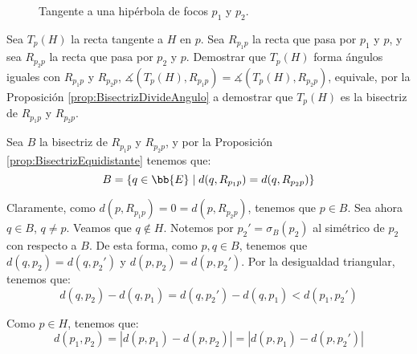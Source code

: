 \begin{ejercicio}
\begin{enumerate}
\begin{figure}[H]
        \caption{Tangente a una hipérbola de focos $p_1$ y $p_2$.}  
        \label{fig:ej5.3.7.TangenteHip}
    \end{figure}
    Sea $T_p(H)$ la recta tangente a $H$ en $p$. Sea $R_{p_1p}$ la recta que pasa por $p_1$ y $p$,
    y sea $R_{p_2p}$ la recta que pasa por $p_2$ y $p$. Demostrar que $T_p(H)$ forma ángulos iguales con $R_{p_1p}$ y $R_{p_2p}$,     
    $\measuredangle(T_p(H), R_{p_1p})=\measuredangle(T_p(H), R_{p_2p})$, equivale, por la Proposición \ref{prop:BisectrizDivideAngulo}
    a demostrar que $T_p(H)$ es la bisectriz de $R_{p_1p}$ y $R_{p_2p}$.

    Sea $B$ la bisectriz de $R_{p_1p}$ y $R_{p_2p}$, y por la Proposición \ref{prop:BisectrizEquidistante} tenemos que:
    \begin{equation*}
        B = \{q\in \bb{E} \mid d(q, R_{p_1p}) = d(q, R_{p_2p})\}
    \end{equation*}

    Claramente, como $d(p, R_{p_1p}) = 0 = d(p, R_{p_2p})$, tenemos que $p\in B$. Sea ahora $q\in B$, $q\neq p$. Veamos que
    $q \notin H$. Notemos por $p_2'=\sigma_{B}(p_2)$ al simétrico de $p_2$ con respecto a $B$.
    De esta forma, como $p,q\in B$, tenemos que $d(q, p_2) = d(q, p_2')$ y $d(p, p_2) = d(p, p_2')$.
    Por la desigualdad triangular, tenemos que:
    \begin{equation*}
          d(q, p_2)  - d(q, p_1)
        = d(q, p_2') - d(q, p_1)
        < d(p_1, p_2')
    \end{equation*}

    Como $p\in H$, tenemos que:
    \begin{equation*}
        d(p_1, p_2) = |d(p, p_1) - d(p, p_2)|
        = |d(p, p_1) - d(p, p_2')|
    \end{equation*}


\end{enumerate}
\end{ejercicio}
